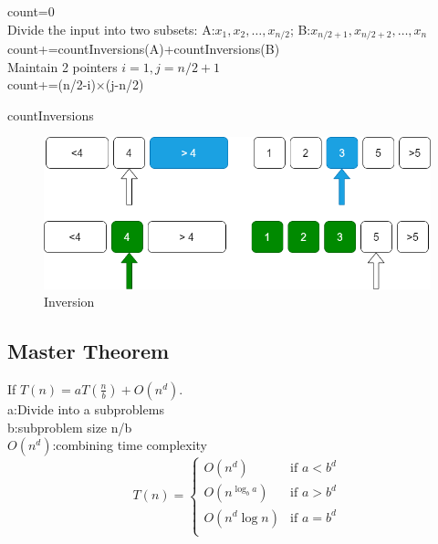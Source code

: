 \begin{algorithm}[H]
    \SetAlgoLined
    count=0\\
    Divide the input into two subsets:
    A:$x_1, x_2, \ldots , x_{n/2}$; 
    B:$x_{n/2+1}, x_{n/2+2}, … , x_n$\\
    count+=countInversions(A)+countInversions(B)\\
    Maintain 2 pointers $i=1,j=n/2+1$ \\
    count+=(n/2-i)$\times $(j-n/2)\\
    \caption{countInversions}
\end{algorithm}
\begin{figure}
    \centering
    \includegraphics[width=0.8\linewidth]{Notes/fig/Inverse.png}
    \caption{Inversion}
    \label{fig:Inversion}
\end{figure}


\subsection{Master Theorem}
\begin{thm}
    If $T(n)=aT(\frac{n}{b})+O(n^d)$.\\
    a:Divide into a subproblems\\
    b:subproblem size n/b\\
    $O(n^d)$:combining time complexity\\
    \begin{equation}
        T(n)=
        \begin{cases}
            O(n^d) & \text{if } a<b^d\\
            O(n^{\log_b a}) & \text{if } a>b^d \\
            O(n^d \log n) & \text{if } a=b^d\\
        \end{cases}    
    \end{equation}

\end{thm}

